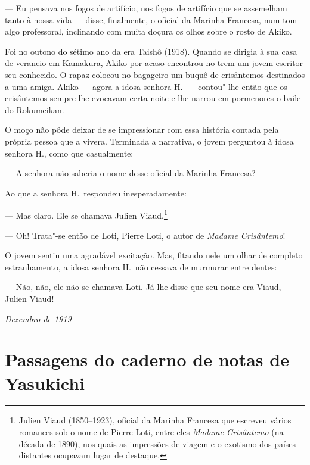 --- Eu pensava nos fogos de artifício, nos fogos de artifício que se
assemelham tanto à nossa vida --- disse, finalmente, o oficial da Marinha
Francesa, num tom algo professoral, inclinando com muita doçura os
olhos sobre o rosto de Akiko.

\sectionitem

Foi no outono do sétimo ano da era Taishô (1918). Quando se dirigia à
sua casa de veraneio em Kamakura, Akiko por acaso encontrou no trem um
jovem escritor seu conhecido. O rapaz colocou no bagageiro um buquê de
crisântemos destinados a uma amiga. Akiko --- agora a idosa senhora H.~---
contou"-lhe então que os crisântemos sempre lhe evocavam certa noite e
lhe narrou em pormenores o baile do Rokumeikan. 

O moço não pôde deixar de se impressionar com essa história contada 
pela própria pessoa que a vivera. Terminada a narrativa, o jovem 
perguntou à idosa senhora H., como que casualmente:

--- A senhora não saberia o nome desse oficial da Marinha Francesa?

Ao que a senhora H.~respondeu inesperadamente:

--- Mas claro. Ele se chamava Julien Viaud.\footnote{ Julien Viaud
(1850--1923), oficial da Marinha Francesa que escreveu vários romances
sob o nome de Pierre Loti, entre eles \textit{Madame Crisântemo} (na
década de 1890), nos quais as impressões de viagem e o exotismo dos
países distantes ocupavam lugar de destaque.}

--- Oh! Trata"-se então de Loti, Pierre Loti, o autor de \textit{Madame
Crisântemo}! 


O jovem sentiu uma agradável excitação. Mas, fitando nele
um olhar de completo estranhamento, a idosa senhora H.~não cessava de
murmurar entre dentes:

--- Não, não, ele não se chamava Loti. Já lhe disse que seu nome era
Viaud, Julien Viaud!

\begin{flushright}
\textit{Dezembro de 1919}\\  
\end{flushright}


\chapter[Passagens do caderno de notas de Yasukichi]{Passagens do caderno de notas de Yasukichi}

